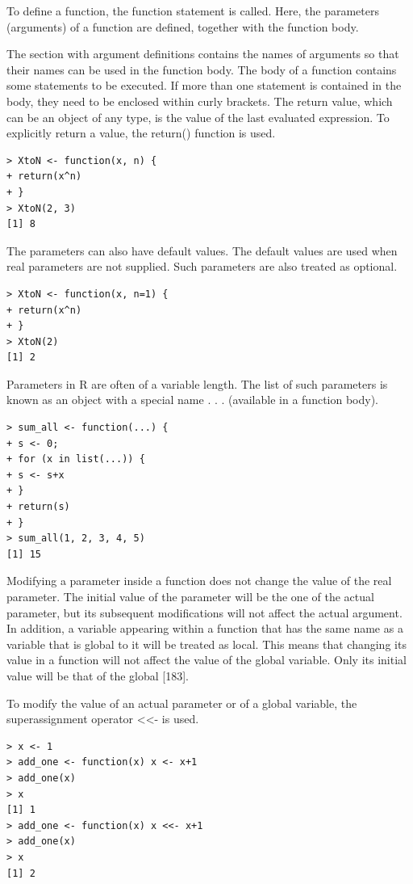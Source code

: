 \documentclass[10pt]{book}
\begin{document}
To define a function, the function statement is called. Here, the parameters (arguments) of a function are defined, together with the function body.

The section with argument definitions contains the names of arguments so that their names can be used in the function body. The body of a function contains some statements to be executed. If more than one statement is contained in the body, they need to be enclosed within curly brackets. The return value, which can be an object of any type, is the value of the last evaluated expression. To explicitly return a value, the return() function is used.

\begin{verbatim}
> XtoN <- function(x, n) {
+ return(x^n)
+ }
> XtoN(2, 3)
[1] 8
\end{verbatim}

The parameters can also have default values. The default values are used when real parameters are not supplied. Such parameters are also treated as optional.

\begin{verbatim}
> XtoN <- function(x, n=1) {
+ return(x^n)
+ }
> XtoN(2)
[1] 2
\end{verbatim}

Parameters in R are often of a variable length. The list of such parameters is known as an object with a special name . . . (available in a function body).

\begin{verbatim}
> sum_all <- function(...) {
+ s <- 0;
+ for (x in list(...)) {
+ s <- s+x
+ }
+ return(s)
+ }
> sum_all(1, 2, 3, 4, 5)
[1] 15
\end{verbatim}

Modifying a parameter inside a function does not change the value of the real parameter. The initial value of the parameter will be the one of the actual parameter, but its subsequent modifications will not affect the actual argument. In addition, a variable appearing within a function that has the same name as a variable that is global to it will be treated as local. This means that changing its value in a function will not affect the value of the global variable. Only its initial value will be that of the global [183].

To modify the value of an actual parameter or of a global variable, the superassignment operator <<- is used.

\begin{verbatim}
> x <- 1
> add_one <- function(x) x <- x+1
> add_one(x)
> x
[1] 1
> add_one <- function(x) x <<- x+1
> add_one(x)
> x
[1] 2
\end{verbatim}
\end{document}
